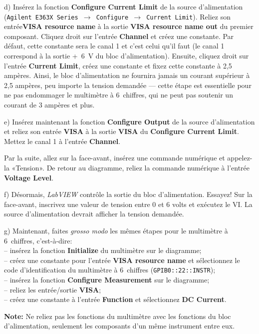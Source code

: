 \documentclass[canadien,12pt,oneside,letterpaper]{article}
\begin{document}
d) Insérez la fonction \textbf{Configure Current Limit} de la source d'alimentation (\texttt{Agilent E363X Series $\rightarrow$ Configure $\rightarrow$ Current Limit}). Reliez son entrée\linebreak\textbf{VISA resource name} à la sortie \textbf{VISA resource name out} du premier composant. Cliquez droit sur l'entrée \textbf{Channel} et créez une constante. Par défaut, cette constante sera le canal 1 et c'est celui qu'il faut (le canal 1 correspond à la sortie +~6~V du bloc d'alimentation). Ensuite, cliquez droit sur l'entrée \textbf{Current Limit}, créez une constante et fixez cette constante à 2,5 ampères. Ainsi, le bloc d'alimentation ne fournira jamais un courant supérieur à 2,5 ampères, peu importe la tension demandée --- cette étape est essentielle pour ne pas endommager le multimètre à 6\textonehalf~chiffres, qui ne peut pas soutenir un courant de 3 ampères et plus.

e) Insérez maintenant la fonction \textbf{Configure Output} de la source d'alimentation et reliez son entrée \textbf{VISA} à la sortie \textbf{VISA} du \textbf{Configure Current Limit}. Mettez le canal 1 à l'entrée \textbf{Channel}.

Par la suite, allez sur la face-avant, insérez une commande numérique et appelez-la «Tension». De retour au diagramme, reliez la commande numérique à l'entrée \textbf{Voltage Level}.

f) Désormais, \textit{LabVIEW} contrôle la sortie du bloc d'alimentation. Essayez! Sur la face-avant, inscrivez une valeur de tension entre 0 et 6 volts et exécutez le VI. La source d'alimentation devrait afficher la tension demandée.

g) Maintenant, faites \textit{grosso modo} les mêmes étapes pour le multimètre à 6\textonehalf~chiffres, c'est-à-dire:\\
-- insérez la fonction \textbf{Initialize} du multimètre sur le diagramme;\\
-- créez une constante pour l'entrée \textbf{VISA resource name} et sélectionnez le code d'identification du multimètre à 6\textonehalf~chiffres (\verb+GPIB0::22::INSTR+);\\
-- insérez la fonction \textbf{Configure Measurement} sur le diagramme;\\
-- reliez les entrée/sortie \textbf{VISA};\\
-- créez une constante à l'entrée \textbf{Function} et sélectionnez \textbf{DC Current}.

\textbf{Note:} Ne reliez pas les fonctions du multimètre avec les fonctions du bloc d'alimentation, seulement les composants d'un même instrument entre eux.
\end{document}
